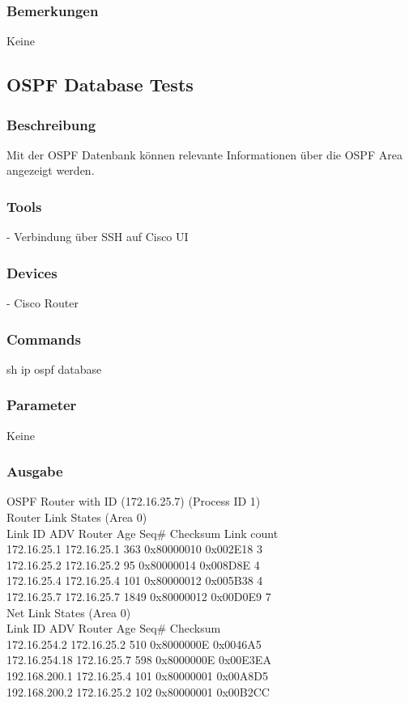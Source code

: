 \documentclass[a4,12pt]{scrartcl}
\begin{document}
\subsubsection{Bemerkungen}
Keine

\subsection{OSPF Database Tests}
\subsubsection{Beschreibung}
Mit der OSPF Datenbank können relevante Informationen über die OSPF Area angezeigt werden.
\subsubsection{Tools}
- Verbindung über SSH auf Cisco UI
\subsubsection{Devices}
- Cisco Router
\subsubsection{Commands}
sh ip ospf database
\subsubsection{Parameter}
Keine
\subsubsection{Ausgabe}
            OSPF Router with ID (172.16.25.7) (Process ID 1)\\

                Router Link States (Area 0)\\

\noindent Link ID         ADV Router      Age         Seq#       Checksum Link count\\
172.16.25.1     172.16.25.1     363         0x80000010 0x002E18 3\\
172.16.25.2     172.16.25.2     95          0x80000014 0x008D8E 4\\
172.16.25.4     172.16.25.4     101         0x80000012 0x005B38 4\\
172.16.25.7     172.16.25.7     1849        0x80000012 0x00D0E9 7\\
                Net Link States (Area 0)\\
\noindent Link ID         ADV Router      Age         Seq#       Checksum\\
172.16.254.2    172.16.25.2     510         0x8000000E 0x0046A5\\
172.16.254.18   172.16.25.7     598         0x8000000E 0x00E3EA\\
192.168.200.1   172.16.25.4     101         0x80000001 0x00A8D5\\
192.168.200.2   172.16.25.2     102         0x80000001 0x00B2CC
\end{document}

